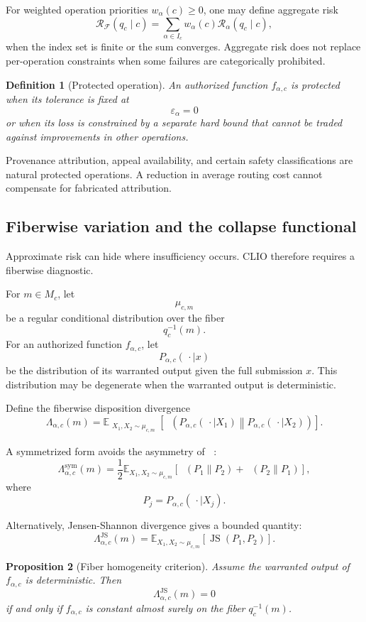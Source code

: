 \documentclass[11pt]{article}
\newtheorem{definition}{Definition}[section]
\newtheorem{proposition}[definition]{Proposition}
\theoremstyle{definition}
\DeclareMathOperator{\KL}{D_{\mathrm{KL}}}
\newcommand{\E}{\mathbb{E}}
\newcommand{\F}{\mathcal{F}}
\newcommand{\eps}{\varepsilon}
\begin{document}
For weighted operation priorities \(w_\alpha(c)\geq0\), one may define aggregate risk
\[
\mathcal R_{\F}(q_c\mid c)
=
\sum_{\alpha\in I_c}
w_\alpha(c)
\mathcal R_\alpha(q_c\mid c),
\]
when the index set is finite or the sum converges. Aggregate risk does not replace per-operation constraints when some failures are categorically prohibited.

\begin{definition}[Protected operation]
An authorized function \(f_{\alpha,c}\) is protected when its tolerance is fixed at
\[
\eps_\alpha=0
\]
or when its loss is constrained by a separate hard bound that cannot be traded against improvements in other operations.
\end{definition}

Provenance attribution, appeal availability, and certain safety classifications are natural protected operations. A reduction in average routing cost cannot compensate for fabricated attribution.

\subsection{Fiberwise variation and the collapse functional}

Approximate risk can hide where insufficiency occurs. CLIO therefore requires a fiberwise diagnostic.

For \(m\in M_c\), let
\[
\mu_{c,m}
\]
be a regular conditional distribution over the fiber
\[
q_c^{-1}(m).
\]
For an authorized function \(f_{\alpha,c}\), let
\[
P_{\alpha,c}(\,\cdot\mid x)
\]
be the distribution of its warranted output given the full submission \(x\). This distribution may be degenerate when the warranted output is deterministic.

Define the fiberwise disposition divergence
\[
\Lambda_{\alpha,c}(m)
=
\E_{\substack{
X_1,X_2\sim\mu_{c,m}
}}
\left[
\KL
\left(
P_{\alpha,c}(\,\cdot\mid X_1)
\middle\|
P_{\alpha,c}(\,\cdot\mid X_2)
\right)
\right].
\]

A symmetrized form avoids the asymmetry of \(\KL\):
\[
\Lambda_{\alpha,c}^{\mathrm{sym}}(m)
=
\frac12
\E_{X_1,X_2\sim\mu_{c,m}}
\left[
\KL(P_1\|P_2)
+
\KL(P_2\|P_1)
\right],
\]
where
\[
P_j
=
P_{\alpha,c}(\,\cdot\mid X_j).
\]

Alternatively, Jensen-Shannon divergence gives a bounded quantity:
\[
\Lambda_{\alpha,c}^{\mathrm{JS}}(m)
=
\E_{X_1,X_2\sim\mu_{c,m}}
\left[
\operatorname{JS}(P_1,P_2)
\right].
\]

\begin{proposition}[Fiber homogeneity criterion]
Assume the warranted output of \(f_{\alpha,c}\) is deterministic. Then
\[
\Lambda_{\alpha,c}^{\mathrm{JS}}(m)=0
\]
if and only if \(f_{\alpha,c}\) is constant almost surely on the fiber \(q_c^{-1}(m)\).
\end{proposition}
\end{document}
